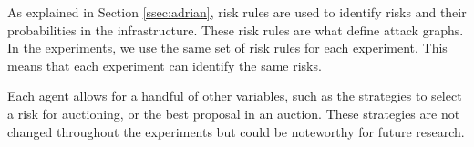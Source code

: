 \label{sssec:risk-rules}
As explained in Section \ref{ssec:adrian}, risk rules are used to identify risks and their probabilities in the infrastructure. These risk rules are what define attack graphs. In the experiments, we use the same set of risk rules for each experiment. This means that each experiment can identify the same risks.

Each agent allows for a handful of other variables, such as the strategies to select a risk for auctioning, or the best proposal in an auction. These strategies are not changed throughout the experiments but could be noteworthy for future research.






